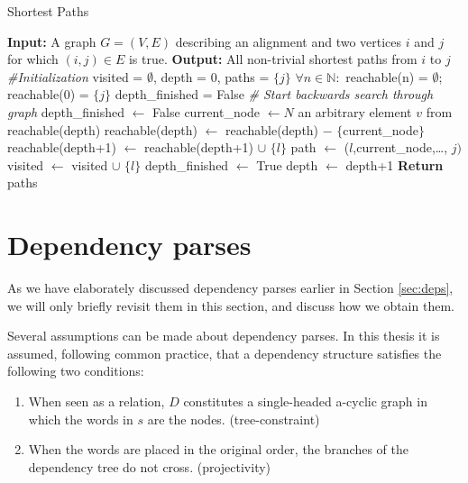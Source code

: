 \documentclass[hidelinks]{report}
\begin{document}
\begin{algorithm}
\caption{Shortest Paths}\label{alg:shortest paths}
\begin{algorithmic}
\STATE \textbf{Input:} A graph $G = (V,E)$ describing an alignment and two vertices $i$ and $j$ for which $(i,j)\in E$ is true.
\STATE \textbf{Output:} All non-trivial shortest paths from $i$ to $j$
\STATE \textit{\#Initialization}
\STATE visited = $\emptyset$, depth = $0$, paths = $\{j\}$
\STATE $\forall n\in\mathbb{N}:$ reachable(n) = $\emptyset$; reachable($0$) = $\{j\}$
\STATE depth\_finished = False
\STATE \textit{\# Start backwards search through graph}
		\STATE depth\_finished $\leftarrow$ False
		\STATE current\_node $\leftarrow N$ an arbitrary element $v$ from reachable(depth)
		\STATE reachable(depth) $\leftarrow$ reachable(depth) $-$ $\{$current\_node$\}$
				\STATE reachable(depth+1) $\leftarrow$ reachable(depth+1) $\cup$ $\{l\}$
					\STATE path $\leftarrow$ ($l$,current\_node,\ldots, $j)$
				\ENDFOR
			\ENDIF
		\STATE visited $\leftarrow$ visited $\cup$ $\{l\}$
		\ENDFOR
	\STATE depth\_finished $\leftarrow$ True
	\STATE depth $\leftarrow$ depth+1
	\ENDWHILE
\ENDWHILE
\STATE \textbf{Return} paths
\end{algorithmic}
\end{algorithm}


\section{Dependency parses}
\label{sec:depparses}

As we have elaborately discussed dependency parses earlier in Section \ref{sec:deps}, we will only briefly revisit them in this section, and discuss how we obtain them.

Several assumptions can be made about dependency parses. In this thesis it is assumed, following common practice, that a dependency structure satisfies the following two conditions:\begin{enumerate}
\item When seen as a relation, $D$ constitutes a single-headed a-cyclic graph in which the words in $s$ are the nodes. (tree-constraint)
\item When the words are placed in the original order, the branches of the dependency tree do not cross. (projectivity)
\end{enumerate}
\end{document}
